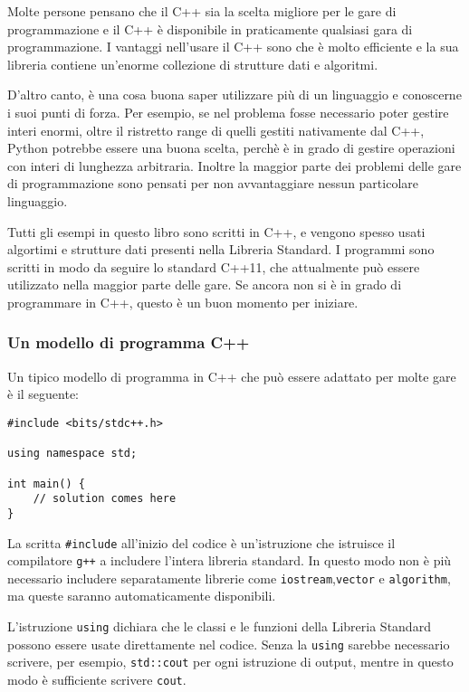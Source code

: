 Molte persone pensano che il C++ sia la scelta migliore
per le gare di programmazione e 
il C++ è disponibile in praticamente qualsiasi 
gara di programmazione.
I vantaggi nell'usare il C++ sono che è molto
efficiente e la sua libreria contiene un'enorme
collezione di strutture dati e algoritmi.

D'altro canto, è una cosa buona saper utilizzare
più di un linguaggio e conoscerne i suoi punti di forza.
Per esempio, se nel problema fosse necessario poter
gestire interi enormi, oltre il ristretto range di quelli
gestiti nativamente dal C++, Python potrebbe essere una
buona scelta, perchè è in grado di gestire operazioni
con interi di lunghezza arbitraria.
Inoltre la maggior parte dei problemi delle gare di programmazione
sono pensati per non avvantaggiare nessun particolare
linguaggio.

Tutti gli esempi in questo libro sono scritti in C++,
e vengono spesso usati algortimi e strutture dati 
presenti nella Libreria Standard.
I programmi sono scritti in modo da seguire lo standard C++11, 
che attualmente può essere utilizzato nella maggior parte delle gare.
Se ancora non si è in grado di programmare in C++,
questo è un buon momento per iniziare.

\subsubsection{Un modello di programma C++}

Un tipico modello di programma in C++ che può essere adattato per molte gare
è il seguente:

\begin{lstlisting}
#include <bits/stdc++.h>

using namespace std;

int main() {
    // solution comes here
}
\end{lstlisting}

La scritta \texttt{\#include} all'inizio del codice
è un'istruzione che istruisce il compilatore \texttt{g++}
a includere l'intera libreria standard.
In questo modo non è più necessario includere separatamente librerie come
\texttt{iostream},\texttt{vector} e \texttt{algorithm},
ma queste saranno automaticamente disponibili.

L'istruzione \texttt{using} dichiara che le classi
e le funzioni della Libreria Standard possono
essere usate direttamente nel codice.
Senza la \texttt{using} sarebbe necessario 
scrivere, per esempio, \texttt{std::cout} per ogni istruzione di output,
mentre in questo modo è sufficiente scrivere \texttt{cout}.


